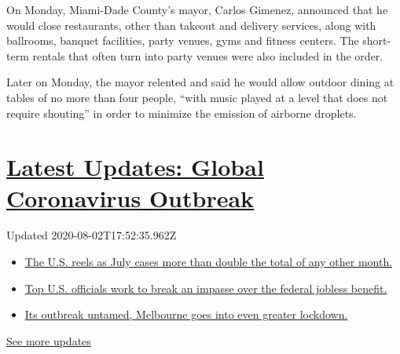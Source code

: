On Monday, Miami-Dade County's mayor, Carlos Gimenez, announced that he
would close restaurants, other than takeout and delivery services, along
with ballrooms, banquet facilities, party venues, gyms and fitness
centers. The short-term rentals that often turn into party venues were
also included in the order.

Later on Monday, the mayor relented and said he would allow outdoor
dining at tables of no more than four people, ``with music played at a
level that does not require shouting'' in order to minimize the emission
of airborne droplets.

\hypertarget{latest-updates-global-coronavirus-outbreak}{%
\section{\texorpdfstring{\href{https://www.nytimes.com/2020/08/01/world/coronavirus-covid-19.html?action=click\&pgtype=Article\&state=default\&region=MAIN_CONTENT_1\&context=storylines_live_updates}{Latest
Updates: Global Coronavirus
Outbreak}}{Latest Updates: Global Coronavirus Outbreak}}\label{latest-updates-global-coronavirus-outbreak}}

Updated 2020-08-02T17:52:35.962Z

\begin{itemize}
\tightlist
\item
  \href{https://www.nytimes.com/2020/08/01/world/coronavirus-covid-19.html?action=click\&pgtype=Article\&state=default\&region=MAIN_CONTENT_1\&context=storylines_live_updates\#link-34047410}{The
  U.S. reels as July cases more than double the total of any other
  month.}
\item
  \href{https://www.nytimes.com/2020/08/01/world/coronavirus-covid-19.html?action=click\&pgtype=Article\&state=default\&region=MAIN_CONTENT_1\&context=storylines_live_updates\#link-780ec966}{Top
  U.S. officials work to break an impasse over the federal jobless
  benefit.}
\item
  \href{https://www.nytimes.com/2020/08/01/world/coronavirus-covid-19.html?action=click\&pgtype=Article\&state=default\&region=MAIN_CONTENT_1\&context=storylines_live_updates\#link-2bc8948}{Its
  outbreak untamed, Melbourne goes into even greater lockdown.}
\end{itemize}

\href{https://www.nytimes.com/2020/08/01/world/coronavirus-covid-19.html?action=click\&pgtype=Article\&state=default\&region=MAIN_CONTENT_1\&context=storylines_live_updates}{See
more updates}

